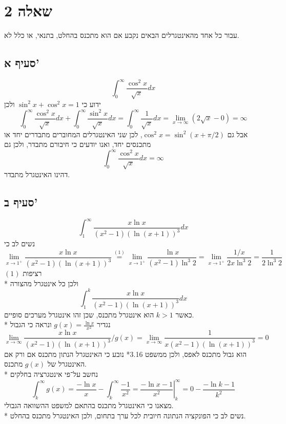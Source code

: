 \section{שאלה 2}
עבור כל אחד מהאינטגרלים הבאים נקבע אם הוא מתכנס בהחלט, בתנאי, או כלל לא.

\subsection{סעיף א'}
\[
	\int_0^\infty \frac{\cos^2 x}{\sqrt{x}}dx
\]
ידוע כי $\sin^2 x + \cos^2 x = 1$ ולכן
\[
	\int_0^\infty \frac{\cos^2 x}{\sqrt{x}}dx + \int_0^\infty \frac{\sin^2 x}{\sqrt{x}}dx
	= \int_0^\infty \frac{1}{\sqrt{x}}dx
	= \lim_{x \to \infty} (2\sqrt{x} - 0)
	= \infty
\]
אבל גם $\cos^2x = \sin^2(x + \pi/2)$, לכן שני האינטגרלים המחוברים מתבדרים יחד או מתכנסים יחד, ואנו יודעים כי חיבורם מתבדר, ולכן גם
\[
	\int_0^\infty \frac{\cos^2 x}{\sqrt{x}}dx = \infty
\]
דהינו האינטגרל מתבדר.

\subsection{סעיף ב'}
\[
	\int_1^\infty \frac{x \ln x}{(x^2 - 1){(\ln(x + 1))}^3} dx
\]
נשים לב כי
\[
	\lim_{x \to 1^+} \frac{x \ln x}{(x^2 - 1){(\ln(x + 1))}^3} 
	\overset{(1)}{=} \lim_{x \to 1^+} \frac{\ln x}{(x^2 - 1) \ln^3 2} 
	= \lim_{x \to 1^+} \frac{1/x}{2x \ln^3 2} 
	= \frac{1}{2\ln^3 2} 
\]
$(1)$ רציפות \\*
ולכן כל אינטגרל מהצורה
\[
	\int_1^k \frac{x \ln x}{(x^2 - 1){(\ln(x + 1))}^3} dx
\]
כאשר $k > 1$ הוא אינטגרל מתכנס, שכן זהו אינטגרל מערכים סופיים. \\*
נגדיר $g(x) = \frac{\ln x}{x^2}$ ונראה כי הגבול
\[
	\lim_{x \to \infty} \frac{x \ln x}{(x^2 - 1){(\ln(x + 1))}^3}/g(x)
	= \lim_{x \to \infty} \frac{1}{x(x^2 - 1){(\ln(x + 1))}^3}
	= 0
\]
הוא גבול מתכנס לאפס,
ולכן ממשפט 3.16* נובע כי האינטגרל הנתון מתכנס אם ורק אם האינטגרל של $g(x)$ מתכנס. \\*
נחשב על־פי אינטגרציה בחלקים
\[
	\int_{k}^{\infty} g(x)
	= \frac{-\ln x}{x} - \int_{k}^{\infty} \frac{-1}{x^2}
	= \left. \frac{-\ln x - 1}{x^2} \right|_k^\infty
	= 0 - \frac{-\ln k - 1}{k^2}
\]
מצאנו כי האינטגרל מתכנס בהתאם למשפט ההשוואה הגבולי. \\*
נשים לב כי הפונקציה הנתונה חיובית לכל ערך בתחום, ולכן האינטגרל מתכנס בהחלט.

